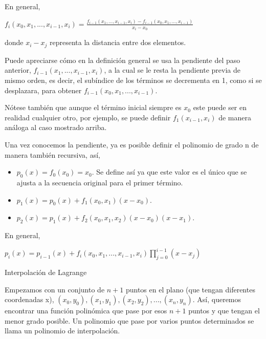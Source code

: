 \hspace{0.4cm} En general,

\begin{center}
$\displaystyle{f_{i}(x_{0},x_{1},...,x_{i-1},x_{i}) = \frac{f_{i-1}(x_{1},...,x_{i-1},x_{i})-f_{i-1}(x_{0},x_{1},...,x_{i-1} )}{x_{i}-x_{0}}}$
\end{center}


\noindent donde  $\displaystyle{x_{i}-x_{j}}$ representa la distancia entre dos elementos.

\hspace{0.4cm} Puede apreciarse c\'omo en la definici\'on general se usa la pendiente del paso anterior, $f_{i-1}(x_{1},...,x_{i-1},x_{i})$, a la cual se le resta la pendiente previa de mismo orden, es decir, el sub\'indice de los t\'erminos se decrementa en 1, como si se desplazara, para obtener $f_{i-1}(x_{0},x_{1},...,x_{i-1})$.

\hspace{0.4cm} N\'otese tambi\'en que aunque el t\'ermino inicial siempre es $x_{0}$ este puede ser en realidad cualquier otro, por ejemplo, se puede definir $f_{1}(x_{i-1},x_{i})$ de manera an\'aloga al caso mostrado arriba.

\hspace{0.4cm} Una vez conocemos la pendiente, ya es posible definir el polinomio de grado n de manera tambi\'en recursiva, as\'i,

\begin{itemize}
  \item $p_{0}(x) = f_{0} (x_{0}) =x_{0}$.  Se define as\'i ya que este valor es el \'unico que se ajusta a la secuencia original para el primer t\'ermino. 
  \item $\displaystyle{p_{1}(x) = p_{0}(x) +  f_{1} (x_{0},x_{1}) (x-x_{0})}$.
  \item $\displaystyle{p_{2}(x) = p_{1}(x) +  f_{2} (x_{0},x_{1},x_{2}) (x-x_{0})(x-x_{1})}$.
\end{itemize}

\hspace{0.4cm} En general,

\begin{center}
$\displaystyle{p_{i}(x) = p_{i-1}(x) +  f_{i} (x_{0},x_{1},...,x_{i-1},x_{i}) \prod_{j=0}^{i-1}(x-x_{j})}$
\end{center}


Interpolaci\'on de Lagrange

\hspace{0.4cm} Empezamos con un conjunto de $n+1$ puntos en el plano (que tengan diferentes coordenadas x), $(x_{0}, y_{0}), (x_{1}, y_{1}), (x_{2}, y_{2}),...,(x_{n}, y_{n})$. As\'i, queremos encontrar una funci\'on polin\'omica que pase por esos $n+1$ puntos y que tengan el menor grado posible. Un polinomio que pase por varios puntos determinados se llama un polinomio de interpolaci\'on.

